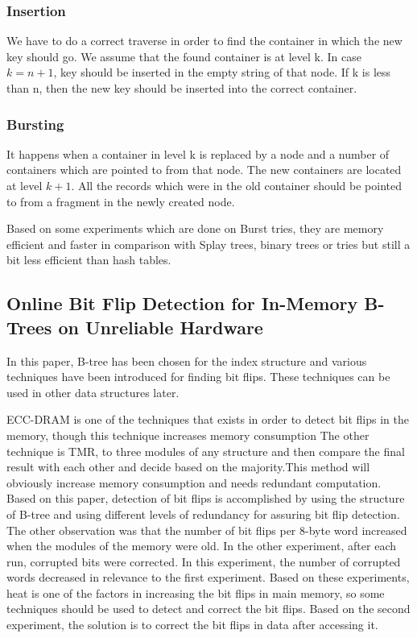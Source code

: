 \documentclass[12pt]{report}
\begin{document}
\subsubsection{Insertion}

We have to do a correct traverse in order to find the container in which the new key should go. We assume that the found container is at level k. In case $k=n+1$, key should be inserted in the empty string of that node. If k is less than n, then the new key should be inserted into the correct container.

\subsubsection{Bursting}

It happens when a container in level k is replaced by a node and a number of containers which are pointed to from that node. The new containers are located at level $k+1$. All the records which were in the old container should be pointed to from a fragment in the newly created node. 

Based on some experiments which are done on Burst tries, they are memory efficient and faster in comparison with Splay trees, binary trees or tries but still a bit less efficient than hash tables.    


\subsection{Online Bit Flip Detection for In-Memory B-Trees on Unreliable Hardware \cite{kolditz} }

In this paper, B-tree has been chosen for the index structure and various techniques have been introduced for finding bit flips. These techniques can be used in other data structures later.

ECC-DRAM is one of the techniques that exists in order to detect bit flips in the memory, though this technique increases memory consumption The other technique is TMR, to three modules of any structure and then compare the final result with each other and decide based on the majority.This method will obviously increase memory consumption and needs redundant computation. Based on this paper, detection of bit flips is accomplished by using the structure of B-tree and using different levels of redundancy for assuring bit flip detection. The other observation was that the number of bit flips per 8-byte word increased when the modules of the memory were old. In the other experiment, after each run, corrupted bits were corrected. In this experiment, the number of corrupted words decreased in relevance to the first experiment. Based on these experiments, heat is one of the factors in increasing the bit flips in main memory, so some techniques should be used to detect and correct the bit flips. Based on the second experiment, the solution is to correct the bit flips in data after accessing it.
\end{document}
